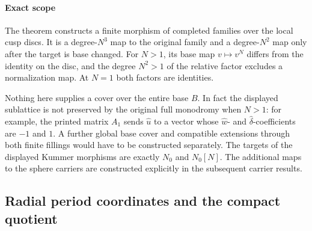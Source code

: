 \paragraph{Exact scope}
\label{wb:cusp-cover-global-scope}

The theorem constructs a finite morphism of completed families over the
local cusp discs.  It is a degree-$N^3$ map to the original family and a
degree-$N^2$ map only after the target is base changed.  For $N>1$, its base map $v\mapsto v^N$ differs from the identity on the disc, and the degree $N^2>1$ of the relative factor excludes a normalization map. At $N=1$ both factors are identities.

Nothing here supplies a cover over the entire base $B$.  In fact the
displayed sublattice is not preserved by the original full monodromy when
$N>1$: for example, the printed matrix $A_1$ sends
$\widehat u$ to a vector whose $\widehat w$- and
$\widehat\delta$-coefficients are $-1$ and $1$.  A further global base
cover and compatible extensions through both finite fillings would have
to be constructed separately.  The targets of the displayed Kummer morphisms are exactly $N_0$ and $N_0[N]$. The additional maps to the sphere carriers are constructed explicitly in the subsequent carrier results.





\subsection{Radial period coordinates and the compact quotient}
\label{mapsIII:carrier-radial-prerequisites}


